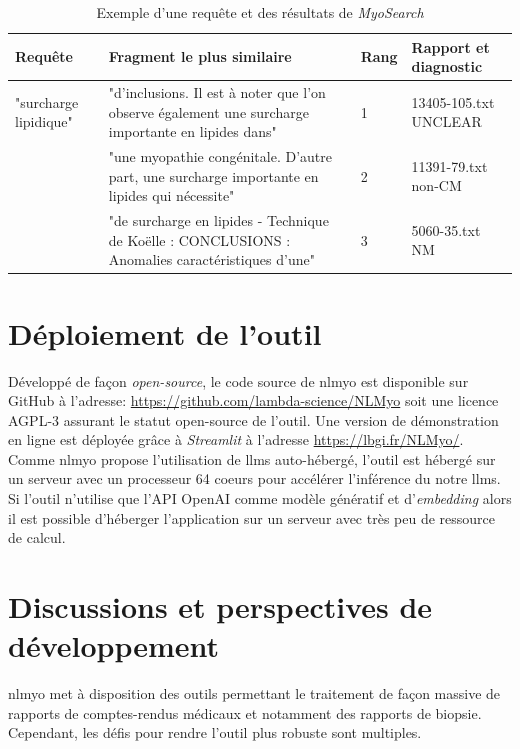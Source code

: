 \begin{table}[!ht]
\centering
\caption{Exemple d'une requête et des résultats de \textit{MyoSearch}}
\label{tab:myosearch_results}
\begin{tabularx}{\textwidth}{|l|X|p{1cm}|p{2cm}|}
\hline
\textbf{Requête} & \textbf{Fragment le plus similaire} & \textbf{Rang} & \textbf{Rapport et diagnostic} \\\hline
"surcharge lipidique" & "d’inclusions. Il est à noter que l’on observe également une surcharge importante en lipides dans" \newline & 1 & 13405-105.txt UNCLEAR \\
 & "une myopathie congénitale. D'autre part, une surcharge importante en lipides qui nécessite"\newline & 2 & 11391-79.txt non-CM \\
 & "de surcharge en lipides - Technique de Koëlle : CONCLUSIONS : Anomalies caractéristiques d’une" & 3 & 5060-35.txt NM \\ \hline
\end{tabularx}
\end{table}

\section{Déploiement de l'outil}
Développé de façon \textit{open-source}, le code source de \gls{nlmyo} est disponible sur GitHub à l'adresse: \href{https://github.com/lambda-science/NLMyo}{https://github.com/lambda-science/NLMyo} soit une licence AGPL-3 assurant le statut open-source de l'outil. Une version de démonstration en ligne est déployée grâce à \textit{Streamlit} à l'adresse \href{https://lbgi.fr/NLMyo/}{https://lbgi.fr/NLMyo/}. Comme \gls{nlmyo} propose l'utilisation de \gls{llms} auto-hébergé, l'outil est hébergé sur un serveur avec un processeur 64 coeurs pour accélérer l'inférence du notre \gls{llms}. Si l'outil n'utilise que l'API OpenAI comme modèle génératif et d'\textit{embedding} alors il est possible d'héberger l'application sur un serveur avec très peu de ressource de calcul.

\section{Discussions et perspectives de développement}
\gls{nlmyo} met à disposition des outils permettant le traitement de façon massive de rapports de comptes-rendus médicaux et notamment des rapports de biopsie. Cependant, les défis pour rendre l'outil plus robuste sont multiples. 

